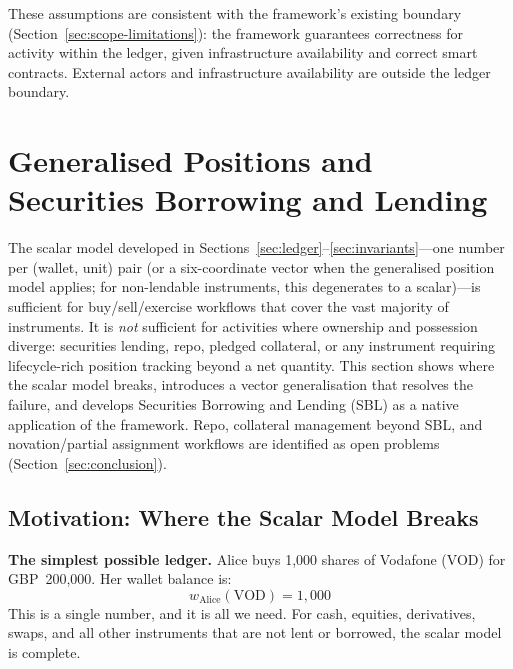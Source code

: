\documentclass[11pt,a4paper]{article}
\begin{document}
\noindent These assumptions are consistent with the framework's existing boundary (Section~\ref{sec:scope-limitations}): the framework guarantees correctness for activity within the ledger, given infrastructure availability and correct smart contracts. External actors and infrastructure availability are outside the ledger boundary.

\clearpage
\section{Generalised Positions and Securities Borrowing and Lending}
\label{sec:gpm}

The scalar model developed in Sections~\ref{sec:ledger}--\ref{sec:invariants}---one number per (wallet, unit) pair (or a six-coordinate vector when the generalised position model applies; for non-lendable instruments, this degenerates to a scalar)---is sufficient for buy/sell/exercise workflows that cover the vast majority of instruments. It is \emph{not} sufficient for activities where ownership and possession diverge: securities lending, repo, pledged collateral, or any instrument requiring lifecycle-rich position tracking beyond a net quantity. This section shows where the scalar model breaks, introduces a vector generalisation that resolves the failure, and develops Securities Borrowing and Lending (SBL) as a native application of the framework. Repo, collateral management beyond SBL, and novation/partial assignment workflows are identified as open problems (Section~\ref{sec:conclusion}).

\subsection{Motivation: Where the Scalar Model Breaks}
\label{sec:scalar-breaks}

\noindent\textbf{The simplest possible ledger.} Alice buys 1{,}000 shares of Vodafone (VOD) for GBP~200{,}000. Her wallet balance is:
\[
w_{\mathrm{Alice}}(\text{VOD}) = 1{,}000
\]
This is a single number, and it is all we need. For cash, equities, derivatives, swaps, and all other instruments that are not lent or borrowed, the scalar model is complete.
\end{document}
